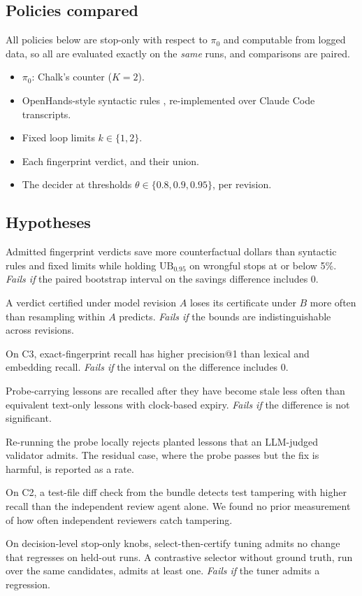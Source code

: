 \documentclass[11pt]{article}
\theoremstyle{remark}
\newcommand{\UB}{\mathrm{UB}}
\begin{document}
\subsection{Policies compared}
All policies below are stop-only with respect to $\pi_0$ and computable from logged data, so all are evaluated exactly on the \emph{same} runs, and comparisons are paired.
\begin{itemize}[leftmargin=*,nosep]
\item $\pi_0$: Chalk's counter ($K=2$).
\item OpenHands-style syntactic rules \citep{openhands2026stuck}, re-implemented over Claude Code transcripts.
\item Fixed loop limits $k\in\{1,2\}$.
\item Each fingerprint verdict, and their union.
\item The decider at thresholds $\theta\in\{0.8,0.9,0.95\}$, per revision.
\end{itemize}

\subsection{Hypotheses}
\begin{description}[leftmargin=*,style=nextline]
\item[H1 (stop control).] Admitted fingerprint verdicts save more counterfactual dollars than syntactic rules and fixed limits while holding $\UB_{0.95}$ on wrongful stops at or below 5\%. \emph{Fails if} the paired bootstrap interval on the savings difference includes 0.
\item[H2 (revision drift).] A verdict certified under model revision $A$ loses its certificate under $B$ more often than resampling within $A$ predicts. \emph{Fails if} the bounds are indistinguishable across revisions.
\item[H3 (exact recall).] On C3, exact-fingerprint recall has higher precision@1 than lexical and embedding recall. \emph{Fails if} the interval on the difference includes 0.
\item[H4 (stale memory).] Probe-carrying lessons are recalled after they have become stale less often than equivalent text-only lessons with clock-based expiry. \emph{Fails if} the difference is not significant.
\item[H5 (poison).] Re-running the probe locally rejects planted lessons that an LLM-judged validator admits. The residual case, where the probe passes but the fix is harmful, is reported as a rate.
\item[H6 (evidence).] On C2, a test-file diff check from the bundle detects test tampering with higher recall than the independent review agent alone. We found no prior measurement of how often independent reviewers catch tampering.
\item[H7 (tuning).] On decision-level stop-only knobs, select-then-certify tuning admits no change that regresses on held-out runs. A contrastive selector without ground truth, run over the same candidates, admits at least one. \emph{Fails if} the tuner admits a regression.
\end{description}
\end{document}

